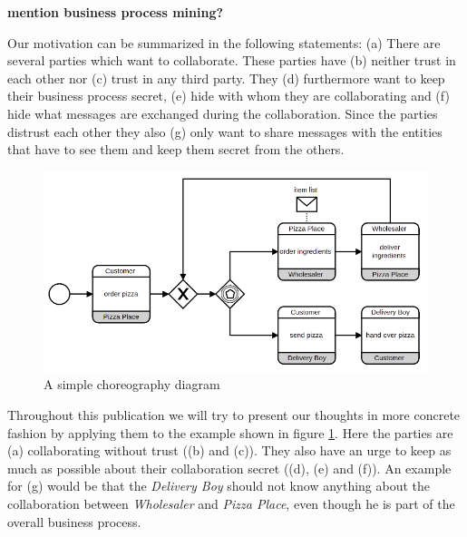 \documentclass[runningheads]{llncs}
\newcommand{\comment}[1]{}
\newcommand{\ber}[1]{(\lowercase\expandafter{#1\relax})} %
\begin{document}
\textbf{mention business process mining?} \cite{van2007business}



Our motivation can be summarized in the following statements: \ber{a} There are several parties which want to collaborate. These parties have \ber{b} neither trust in each other nor \ber{c} trust in any third party. They \ber{d} furthermore want to keep their business process secret, \ber{e} hide with whom they are collaborating and \ber{f} hide what messages are exchanged during the collaboration. Since the parties distrust each other they also \ber{g} only want to share messages with the entities that have to see them and keep them secret from the others.

\comment{
\begin{itemize}
    \item there are several parties who want to collaborate 
    \item parties have no trust in each other 
    \item parties have no trust in a third party
    \item parties have strong interest in keeping things secret
\end{itemize}
}


\begin{figure}[h!]
    \centering
    \includegraphics[scale=0.6]{bpmn.png}
    \caption{A simple choreography diagram}
    \label{fig:simple_bpmn}
\end{figure}


Throughout this publication we will try to present our thoughts in more concrete fashion by applying them to the example shown in figure \ref{fig:simple_bpmn}. Here the parties are \ber{a} collaborating without trust (\ber{b} and \ber{c}). They also have an urge to keep as much as possible about their collaboration secret (\ber{d}, \ber{e} and \ber{f}). An example for \ber{g} would be that the \textit{Delivery Boy} should not know anything about the collaboration between \textit{Wholesaler} and \textit{Pizza Place}, even though he is part of the overall business process. 
\end{document}
